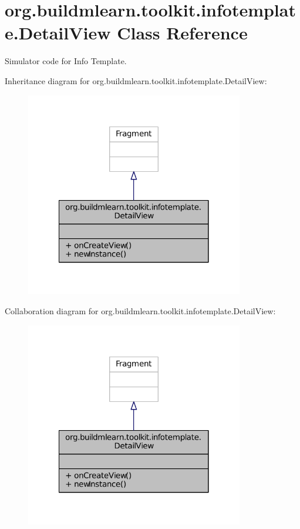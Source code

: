 \hypertarget{classorg_1_1buildmlearn_1_1toolkit_1_1infotemplate_1_1DetailView}{\section{org.\-buildmlearn.\-toolkit.\-infotemplate.\-Detail\-View Class Reference}
\label{classorg_1_1buildmlearn_1_1toolkit_1_1infotemplate_1_1DetailView}
}


Simulator code for Info Template.  




Inheritance diagram for org.\-buildmlearn.\-toolkit.\-infotemplate.\-Detail\-View\-:
\nopagebreak
\begin{figure}[H]
\begin{center}
\leavevmode
\includegraphics[width=270pt]{da/d98/classorg_1_1buildmlearn_1_1toolkit_1_1infotemplate_1_1DetailView__inherit__graph}
\end{center}
\end{figure}


Collaboration diagram for org.\-buildmlearn.\-toolkit.\-infotemplate.\-Detail\-View\-:
\nopagebreak
\begin{figure}[H]
\begin{center}
\leavevmode
\includegraphics[width=270pt]{d7/d10/classorg_1_1buildmlearn_1_1toolkit_1_1infotemplate_1_1DetailView__coll__graph}
\end{center}
\end{figure}
